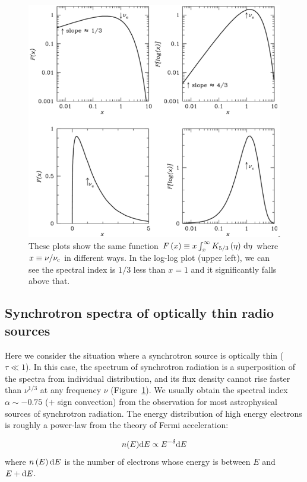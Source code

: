 \begin{figure}[htbp]
	\centering
	\includegraphics[width=.7\linewidth]{Chapter_2/Figures/NRAO_radio5n6.png}
    \caption[The synchrotron spectrum of a single electron]{\label{fig:nrao_radio5n6}
        These plots show the same function $F\left(x\right) \equiv x\int^{\infty}_x K_{5/3}\left(\eta\right)\,\mathrm{d}\eta$ where $x \equiv \nu / \nu_{\mathrm{c}}$ in different ways.
        In the log-log plot (upper left), we can see the spectral index is $1/3$ less than $x=1$ and it significantly falls above that.
    }
\end{figure}



\subsection{Synchrotron spectra of optically thin radio sources}\label{subsec:synchrotronspectra_opticallythin}
Here we consider the situation where a synchrotron source is optically thin ($\tau \ll 1$).
In this case, the spectrum of synchrotron radiation is a superposition of the spectra from individual distribution, and its flux density cannot rise faster than $\nu^{1/3}$ at any frequency $\nu$ (Figure~\ref{fig:nrao_radio5n6}).
We usually obtain the spectral index $\alpha\sim-0.75$ ($+$ sign convection) from the observation for most astrophysical sources of synchrotron radiation.
The energy distribution of high energy electrons is roughly a power-law from the theory of Fermi acceleration:

\begin{equation}\label{eq:essential_radio5n70}
    n(E) \mathrm{d} E \propto E^{-\delta} \mathrm{d} E
\end{equation}
where $n\left(E\right)\mathrm{d} E$ is the number of electrons whose energy is between $E$ and $E+\mathrm{d} E$.

